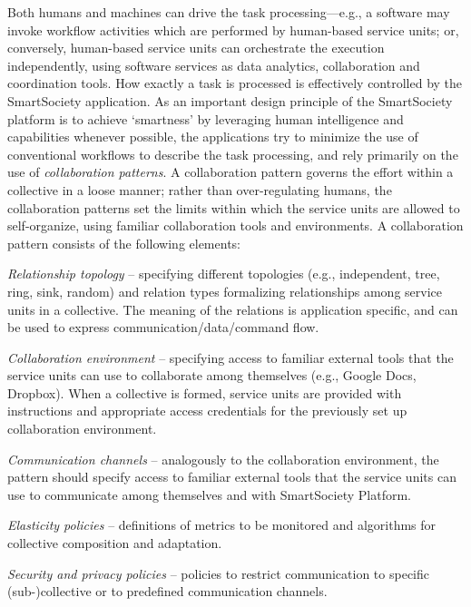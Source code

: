 \documentclass{llncs}
\begin{document}
      Both humans and machines can drive the task processing---e.g., a software may invoke workflow activities which are performed by  human-based service units; or, conversely, human-based service units can orchestrate the execution independently, using software services as data analytics, collaboration and coordination tools.
      How exactly a task is processed is effectively controlled by the SmartSociety application.  As an important design principle of the SmartSociety platform is to achieve `smartness' by leveraging human intelligence and capabilities whenever possible, the applications try to minimize the use of conventional workflows to describe the task processing, and rely primarily on the use of \emph{collaboration patterns}. 
      A collaboration pattern governs the effort within a collective in a loose manner; rather than over-regulating humans, the collaboration patterns set the limits within which the service units are allowed to self-organize, using familiar collaboration tools and environments. 
      A collaboration pattern consists of the following elements:
      \begin{inparaenum}[1) \itshape]%
            \item \emph{Relationship topology} -- specifying different topologies (e.g., independent, tree, ring, sink, random) and relation types formalizing relationships among service units in a collective. The meaning of the relations is application specific, and can be used to express communication/data/command flow. 
            \item \emph{Collaboration environment} -- specifying access to familiar external tools that the service units can use to collaborate among themselves (e.g., Google Docs, Dropbox). When a collective is formed, service units are provided with instructions and appropriate access credentials for the previously set up collaboration environment. 
            \item \emph{Communication channels} -- analogously to the collaboration environment, the pattern should specify access to familiar external tools that the service units can use to communicate among themselves and with SmartSociety Platform. 
            \item \emph{Elasticity policies} -- definitions of metrics to be monitored and algorithms for collective composition and adaptation.
            \item \emph{Security and privacy policies} -- policies to restrict communication to specific (sub-)collective or to predefined communication channels.
          \end{inparaenum}
\end{document}
